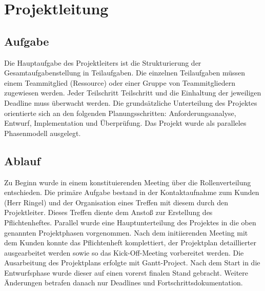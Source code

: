 \documentclass{scrartcl}
\date{}
\begin{document}
\maketitle
\tableofcontents
\renewcommand{\maketitle}{}
\renewcommand{\tableofcontents}{}

\section{Projektleitung}
\subsection{Aufgabe}
Die Hauptaufgabe des Projektleiters ist die Strukturierung der Gesamtaufgabenstellung in Teilaufgaben. Die einzelnen Teilaufgaben müssen einem Teammitglied (Ressource) oder einer Gruppe von Teammitgliedern zugewiesen werden. Jeder Teilschritt Teilschritt und die Einhaltung der jeweiligen Deadline muss überwacht werden. Die grundsätzliche Unterteilung des Projektes orientierte sich an den folgenden Planungsschritten: Anforderungsanalyse, Entwurf, Implementation und Überprüfung. Das Projekt wurde als paralleles Phasenmodell ausgelegt.

\subsection{Ablauf}
Zu Beginn wurde in einem konstituierenden Meeting über die Rollenverteilung entschieden. %
Die primäre Aufgabe bestand in der Kontaktaufnahme zum Kunden (Herr Ringel) und der Organisation eines Treffen mit diesem durch den Projektleiter. Dieses Treffen diente dem Anstoß zur Erstellung des Pflichtenheftes. Parallel wurde eine Hauptunterteilung des Projektes in die oben genannten Projektphasen vorgenommen. Nach dem initiierenden Meeting mit dem Kunden konnte das Pflichtenheft komplettiert, der Projektplan detaillierter ausgearbeitet werden sowie so das Kick-Off-Meeting vorbereitet werden. Die Ausarbeitung des Projektplans erfolgte mit Gantt-Project. Nach dem Start in die Entwurfsphase wurde dieser auf einen vorerst finalen Stand gebracht. Weitere Änderungen betrafen danach nur Deadlines und Fortschrittsdokumentation.
\end{document}
